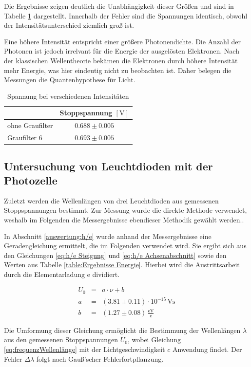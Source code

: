 \documentclass[12pt,a4paper]{scrartcl}
\numberwithin{equation}{section} %
\begin{document}
Die Ergebnisse zeigen deutlich die Unabhängigkeit dieser Größen und sind in Tabelle \ref{tab:Spannung Intensität} dargestellt. Innerhalb der Fehler sind die Spannungen identisch, obwohl der Intensitätsunterschied ziemlich groß ist.

Eine höhere Intensität entspricht einer größere Photonendichte. Die Anzahl der Photonen ist jedoch irrelvant für die Energie der ausgelösten Elektronen. Nach der klassischen Wellentheorie bekämen die Elektronen durch höhere Intensität mehr Energie, was hier eindeutig nicht zu beobachten ist. Daher belegen die Messungen die Quantenhypothese für Licht.

\begin{table}[h!]
	\centering
	\begin{tabular}{l|c}
		& Stoppspannung $[\mathrm{V}]$ \\
		\hline
		ohne Graufilter & $0.688 \pm 0.005$ \\
		Graufilter $6$ & $0.693 \pm 0.005$
	\end{tabular}
	\caption{Spannung bei verschiedenen Intensitäten}
	\label{tab:Spannung Intensität}
\end{table}

\subsection{Untersuchung von Leuchtdioden mit der Photozelle}

Zuletzt werden die Wellenlängen von drei Leuchtdioden aus gemessenen Stoppspannungen bestimmt. Zur Messung wurde die direkte Methode verwendet, weshalb im Folgenden die Messergebnisse ebendieser Methodik gewählt werden..

In Abschnitt \ref{auswertung:h/e} wurde anhand der Messergebnisse eine Geradengleichung ermittelt, die im Folgenden verwendet wird. Sie ergibt sich aus den Gleichungen \eqref{eq:h/e Steigung} und \eqref{eq:h/e Achsenabschnitt} sowie den Werten aus Tabelle \ref{table:Ergebnisse Energie}. Hierbei wird die Austrittsarbeit durch die Elementarladung $\mathrm{e}$ dividiert.

\begin{eqnarray}
	U_0 &=& a \cdot \nu + b \\
	a &=& (3.81\pm 0.11)\cdot10^{-15}\mathrm{\,Vs} \\
	b &=& (1.27 \pm 0.08) \,\frac{\mathrm{eV}}{\mathrm{e}}
\end{eqnarray}

\noindent
Die Umformung dieser Gleichung ermöglicht die Bestimmung der Wellenlängen $\lambda$ aus den gemessenen Stoppspannungen $U_0$, wobei Gleichung \eqref{eq:frequenzWellenlänge} mit der Lichtgeschwindigkeit $c$ Anwendung findet. Der Fehler $\Delta \lambda$ folgt nach Gauß'scher Fehlerfortpflanzung.
\end{document}
